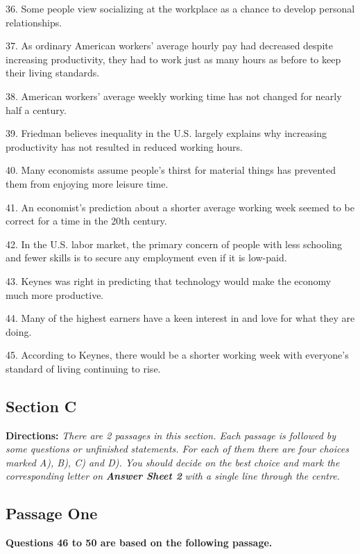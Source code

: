 \documentclass[UTF8,11pt]{ctexart}
\begin{document}
36. Some people view socializing at the workplace as a chance to develop personal relationships.


37. As ordinary American workers’ average hourly pay had decreased despite increasing productivity, they had to work just as many hours as before to keep their living standards.


38. American workers’ average weekly working time has not changed for nearly half a century.


39. Friedman believes inequality in the U.S. largely explains why increasing productivity has not resulted in reduced working hours.


40. Many economists assume people’s thirst for material things has prevented them from enjoying more leisure time.


41. An economist’s prediction about a shorter average working week seemed to be correct for a time in the 20th century.


42. In the U.S. labor market, the primary concern of people with less schooling and fewer skills is to secure any employment even if it is low-paid.


43. Keynes was right in predicting that technology would make the economy much more productive.


44. Many of the highest earners have a keen interest in and love for what they are doing.


45. According to Keynes, there would be a shorter working week with everyone’s standard of living continuing to rise.


\subsection*{\textbf{Section C}}


\textbf{Directions: }\textit{There are 2 passages in this section. Each passage is followed by some questions or unfinished} \textit{statements. For each of them there are four choices marked A), B), C) and D). You should decide on the best} \textit{choice and mark the corresponding letter on }\textbf{\textit{Answer Sheet 2}}\textit{ with a single line through the centre.}


\subsection*{\textbf{Passage One}}


\textbf{Questions 46 to 50 are based on the following passage.}
\end{document}

